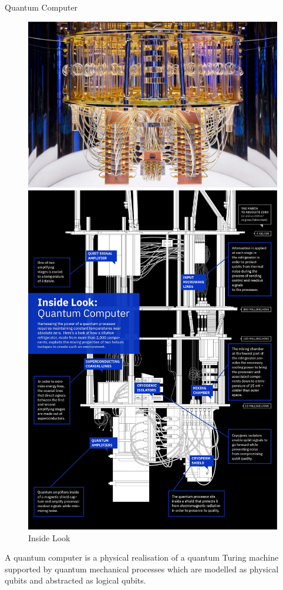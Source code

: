 \begin{frame}{Quantum Computer}
\begin{figure}[!htb]
   \begin{minipage}{0.48\textwidth}
     \centering
     \includegraphics[width=.6\textwidth, height=.3\textheight]{quantum-computer}
     \caption{IBM Quantum Computer}\label{Fig:Data1}
   \end{minipage}\hfill
   \begin{minipage}{0.48\textwidth}
     \centering
     \includegraphics[width=.6\textwidth, height=.3\textheight]{LEPbw}
     \caption{Inside Look}\label{Fig:Data2}
   \end{minipage}
\end{figure}
A quantum computer is a physical realisation of a quantum Turing machine supported by quantum mechanical processes which are modelled as physical qubits and abstracted as logical qubits.
\end{frame}

